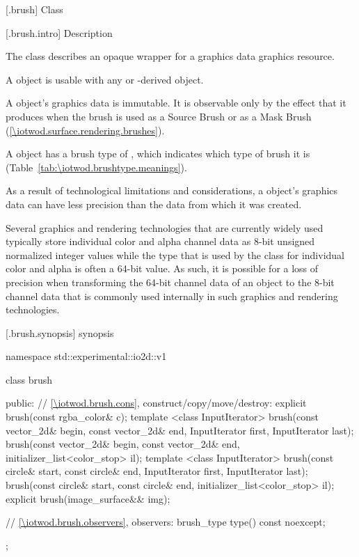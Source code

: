  [\iotwod.brush] {Class }

 [\iotwod.brush.intro] { Description}

\pnum
{}%
The class  describes an opaque wrapper for a graphics data graphics resource.

\pnum
A  object is usable with any  or -derived object.

\pnum
A  object's graphics data is immutable. It is observable only by the effect that it produces when the brush is used as a Source Brush or as a Mask Brush (\ref{\iotwod.surface.rendering.brushes}).

\pnum
A  object has a brush type of , which indicates which type of brush it is (Table~\ref{tab:\iotwod.brushtype.meanings}).

\pnum
As a result of technological limitations and considerations, a  object's graphics data can have less precision than the data from which it was created.

\pnum
\begin{example}
Several graphics and rendering technologies that are currently widely used typically store individual color and alpha channel data as 8-bit unsigned normalized integer values while the  type that is used by the  class for individual color and alpha is often a 64-bit value. As such, it is possible for a loss of precision when transforming the 64-bit channel data of an  object to the 8-bit channel data that is commonly used internally in such graphics and rendering technologies.
\end{example}

 [\iotwod.brush.synopsis] { synopsis}

\begin{codeblock}
namespace std::experimental::io2d::v1 {
  class brush {
  public:
    // \ref{\iotwod.brush.cons}, construct/copy/move/destroy:
    explicit brush(const rgba_color& c);
    template <class InputIterator>
    brush(const vector_2d& begin, const vector_2d& end,
      InputIterator first, InputIterator last);
    brush(const vector_2d& begin, const vector_2d& end,
      initializer_list<color_stop> il);
    template <class InputIterator>
    brush(const circle& start, const circle& end,
      InputIterator first, InputIterator last);
    brush(const circle& start, const circle& end,
      initializer_list<color_stop> il);
    explicit brush(image_surface&& img);

    // \ref{\iotwod.brush.observers}, observers:
    brush_type type() const noexcept;
  };
}
\end{codeblock}

